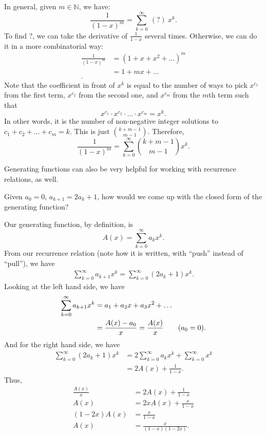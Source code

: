 In general, given \( m \in \mathbb{N} \), we have:\[
	\frac{1}{(1-x)^{m}} = \sum_{k=0}^{\infty} ~(?)~x^{k}
.\] 
To find \( ? \), we can take the derivative of \( \frac{1}{1-x} \) several times. Otherwise, we can do it in a more combinatorial way:
\begin{align*}
	\frac{1}{(1-x)^m} &= (1+x+x^2+\ldots )^m \\
										&= 1 + mx + \ldots  \\
.\end{align*}
Note that the coefficient in front of \( x^k \) is equal to the number of ways to pick \( x^{c_1}  \) from the first term, \( x^{c_2}  \) from the second one, and \( x^{c_m}  \) from the \( m \)th term such that \[
	x^{c_1} \cdot  x^{c_2} \cdot  \ldots \cdot  x^{c_m} = x^k
.\] In other words, it is the number of non-negative integer solutions to \( c_{1}+c_{2}+\ldots +c_m =k\). This is just \( \binom{k+m-1}{m-1} \). Therefore, \[
	\frac{1}{(1-x)^{m}} = \sum_{k=0}^{\infty} \binom{k+m-1}{m-1} x^{k}
.\] 

Generating functions can also be very helpful for working with recurrence relations, as well.

\begin{eg}
	Given \( a_0=0 \), \( a_{k+1}=2a_k + 1 \), how would we come up with the closed form of the generating function?
\end{eg}

Our generating function, by definition, is \[
	A(x) = \sum_{k=0}^{\infty}a_k x^k
.\] From our recurrence relation (note how it is written, with ``push'' instead of ``pull''), we have 
\begin{align*}
	\sum_{k=0}^{\infty} a_{k+1} x^k = \sum_{k=0}^{\infty}(2a_k + 1)x^k
.\end{align*}
Looking at the left hand side, we have 
\begin{align*}
	\sum_{k=0}^{\infty}a_{k+1}x^k &= a_{1}+a_{2}x+a_{3}x^2+\ldots  \\
	&= \frac{A(x) - a_{0}}{x} = \frac{A(x)}{x} \tag{\( a_{0}=0 \)}
.\end{align*}
And for the right hand side, we have
\begin{align*}
	\sum_{k=0}^{\infty}(2a_k +1)x^k &= 2\sum_{k=0}^{\infty}a_kx^k + \sum_{k=0}^{\infty}x^k \\
	&= 2A(x) + \frac{1}{1-x}
.\end{align*}
Thus,
\begin{align*}
	\frac{A(x)}{x} &= 2A(x) + \frac{1}{1-x} \\
	A(x) &= 2xA(x) + \frac{x}{1-x} \\
	(1-2x)A(x) &= \frac{x}{1-x} \\
	A(x) &= \frac{x}{(1-x)(1-2x)}
.\end{align*}

